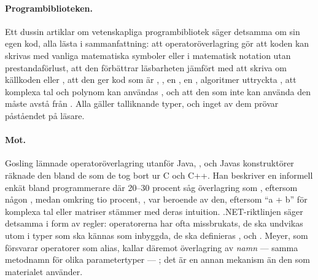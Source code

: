 \paragraph{Programbiblioteken.}  Ett dussin artiklar om vetenskapliga
programbibliotek säger detsamma om sin egen kod, alla lästa i sammanfattning: att operatoröverlagring gör att
koden kan skrivas med vanliga matematiska symboler\autocite{Weller1998Tensorial}
eller i matematisk notation utan prestandaförlust\autocite{Hardtlein2009Expression},
att den förbättrar läsbarheten jämfört med att skriva om
källkoden\autocite{Kerstan2008Enabling} eller
, att den ger kod som är \autocite[liknande][]{Martins2009pyMDO},
,
en , en
, algoritmer uttryckta
, att
komplexa tal och polynom kan användas , och att den som inte kan använda den måste avstå
från .  Alla gäller talliknande typer, och inget av dem prövar
påståendet på läsare.

\paragraph{Mot.}  Gosling lämnade operatoröverlagring utanför Java,
, och Javas konstruktörer räknade
den bland de  som
de tog bort ur C och C++.  Han beskriver en informell
enkät bland programmerare där 20--30 procent såg överlagring som
, eftersom någon
, medan omkring tio procent,
, var beroende av den, eftersom \enquote{a + b} för komplexa tal
eller matriser stämmer med deras intuition.  .NET-riktlinjen säger
detsamma i form av regler: operatorerna har ofta missbrukats, de ska
undvikas utom i typer som ska kännas som inbyggda, de ska definieras
,
och .  Meyer, som försvarar operatorer som alias, kallar
däremot överlagring av \emph{namn} --- samma metodnamn för olika
parametertyper --- ; det är en annan mekanism än den som
materialet använder.

